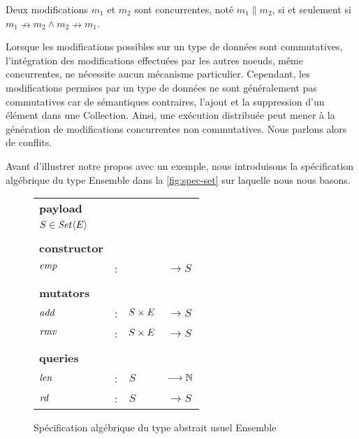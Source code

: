 \begin{definition}[Concurrence]
  Deux modifications $m_1$ et $m_2$ sont concurrentes, noté $m_1 \parallel m_2$, si et seulement si $m_1 \nrightarrow m_2 \land m_2 \nrightarrow m_1$.
\end{definition}

Lorsque les modifications possibles sur un type de données sont commutatives, l'intégration des modifications effectuées par les autres noeuds, même concurrentes, ne nécessite aucun mécanisme particulier.
Cependant, les modifications permises par un type de données ne sont généralement pas commutatives car de sémantiques contraires, \eg l'ajout et la suppression d'un élément dans une Collection.
Ainsi, une exécution distribuée peut mener à la génération de modifications concurrentes non commutatives.
Nous parlons alors de conflits.

Avant d'illustrer notre propos avec un exemple, nous introduisons la spécification algébrique du type Ensemble dans la \autoref{fig:spec-set} sur laquelle nous nous basons.

\begin{figure}[!ht]

  \centering
    \begin{tabular}{llll}
      \textbf{payload} \\
      $S \in \mathit{Set}\langle E \rangle$ & & & \\
      \\
      \textbf{constructor} \\
      $\mathit{emp}$ & : &                       & $\longrightarrow S$   \\
      \\
      \textbf{mutators} \\
      $\mathit{add}$ & : & $S \times E$ & $\longrightarrow S$   \\
      $\mathit{rmv}$ & : & $S \times E$          & $\longrightarrow S$   \\
      \\
      \textbf{queries} \\
      $\mathit{len}$ & : & $S$                   & $\longrightarrow \mathbb{N}$   \\
      $\mathit{rd}$  & : & $S$                   & $\longrightarrow S$ \\
    \end{tabular}
  \caption{Spécification algébrique du type abstrait usuel Ensemble}
  \label{fig:spec-set}
\end{figure}

